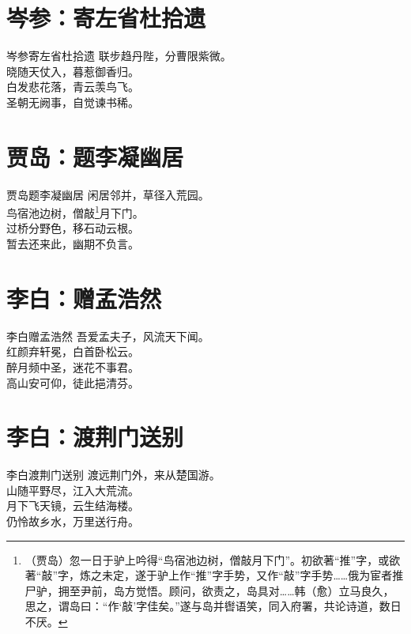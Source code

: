 \documentclass[12pt,oneside,a5paper]{book}
\begin{document}
\chapter{岑参：寄左省杜拾遗}
\begin{poemzh}{岑参}{寄左省杜拾遗}
联步趋丹陛，分曹限紫微。\\
晓随天仗入，暮惹御香归。\\
白发悲花落，青云羡鸟飞。\\
圣朝无阙事，自觉谏书稀。\\ 
\end{poemzh}

\chapter{贾岛：题李凝幽居}
\begin{poemzh}{贾岛}{题李凝幽居}
闲居邻并，草径入荒园。\\
鸟宿池边树，僧敲\footnote[1]{（贾岛）忽一日于驴上吟得“鸟宿池边树，僧敲月下门”。初欲著“推”字，或欲著“敲”字，炼之未定，遂于驴上作“推”字手势，又作“敲”字手势……俄为宦者推尸驴，拥至尹前，岛方觉悟。顾问，欲责之，岛具对……韩（愈）立马良久，思之，谓岛曰：“作‘敲’字佳矣。”遂与岛并辔语笑，同入府署，共论诗道，数日不厌。}月下门。\\
过桥分野色，移石动云根。\\
暂去还来此，幽期不负言。\\
\end{poemzh}

\chapter{李白：赠孟浩然}
\begin{poemzh}{李白}{赠孟浩然}
吾爱孟夫子，风流天下闻。\\
红颜弃轩冕，白首卧松云。\\
醉月频中圣，迷花不事君。\\
高山安可仰，徒此挹清芬。\\ 
\end{poemzh}

\chapter{李白：渡荆门送别}
\begin{poemzh}{李白}{渡荆门送别}
渡远荆门外，来从楚国游。\\
山随平野尽，江入大荒流。\\
月下飞天镜，云生结海楼。\\
仍怜故乡水，万里送行舟。\\ 
\end{poemzh}
\end{document}

